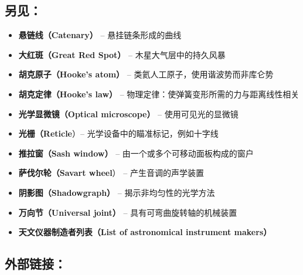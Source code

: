 \subsection{另见：}
\begin{itemize}
\item \textbf{悬链线（Catenary）} – 悬挂链条形成的曲线  
\item \textbf{大红斑（Great Red Spot）} – 木星大气层中的持久风暴  
\item \textbf{胡克原子（Hooke's atom）} – 类氦人工原子，使用谐波势而非库仑势  
\item \textbf{胡克定律（Hooke's law）} – 物理定律：使弹簧变形所需的力与距离线性相关  
\item \textbf{光学显微镜（Optical microscope）} – 使用可见光的显微镜  
\item \textbf{光栅（Reticle}）– 光学设备中的瞄准标记，例如十字线  
\item \textbf{推拉窗（Sash window）} – 由一个或多个可移动面板构成的窗户  
\item \textbf{萨伐尔轮（Savart wheel}） – 产生音调的声学装置  
\item \textbf{阴影图（Shadowgraph）} – 揭示非均匀性的光学方法  
\item \textbf{万向节（Universal joint）} – 具有可弯曲旋转轴的机械装置  
\item \textbf{天文仪器制造者列表（List of astronomical instrument makers）}
\end{itemize}
\subsection{外部链接：}

